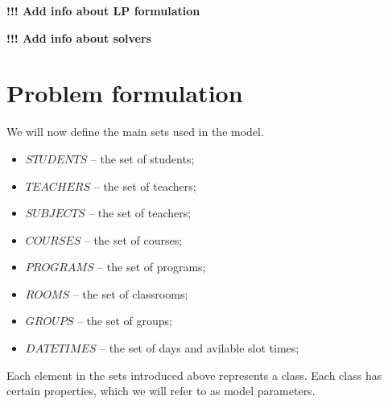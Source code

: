 \documentclass{article}
\begin{document}
\textbf{!!! Add info about LP formulation}

\textbf{!!! Add info about solvers}

\section{Problem formulation}

We will now define the main sets used in the model.

\begin{itemize}
  \setlength\itemsep{0.05em}
    \item $STUDENTS$ -- the set of students;
    \item $TEACHERS$ -- the set of teachers;
    \item $SUBJECTS$ -- the set of teachers;
    \item $COURSES$ -- the set of courses;
    \item $PROGRAMS$ -- the set of programs;
    \item $ROOMS$ -- the set of classrooms;
    \item $GROUPS$ -- the set of groups;
    \item $DATETIMES$ -- the set of days and avilable slot times;
\end{itemize}

Each element in the sets introduced above represents a class. Each class has certain properties, which we will refer to as model parameters.
\end{document}
